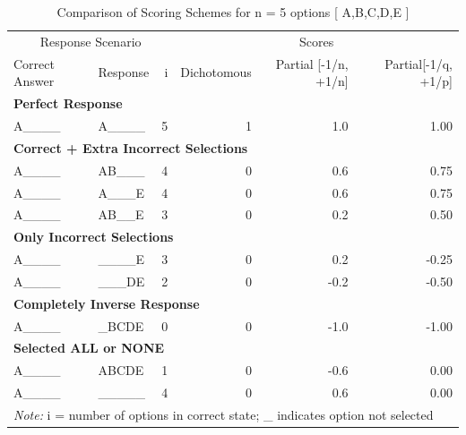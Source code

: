 \documentclass[
  letterpaper,
  DIV=11,
  numbers=noendperiod]{scrreprt}
\begin{document}
\begin{table}

\caption{Comparison of Scoring Schemes for n = 5 options [ A,B,C,D,E ]}
\centering
\begin{tabular}[t]{l|l|r|r|r|r}
\hline
\multicolumn{3}{c|}{Response Scenario } & \multicolumn{3}{c}{Scores} \\
\cline{1-3} \cline{4-6}
Correct Answer & Response & i  & Dichotomous & Partial [-1/n, +1/n] & Partial[-1/q, +1/p]\\
\hline
\multicolumn{6}{l}{\textbf{Perfect Response}}\\
\hline
\hspace{1em}A\_\_\_\_ & A\_\_\_\_ & 5 & 1 & 1.0 & 1.00\\
\hline
\multicolumn{6}{l}{\textbf{Correct + Extra Incorrect Selections}}\\
\hline
\hspace{1em}A\_\_\_\_ & AB\_\_\_ & 4 & 0 & 0.6 & 0.75\\
\hline
\hspace{1em}A\_\_\_\_ & A\_\_\_E & 4 & 0 & 0.6 & 0.75\\
\hline
\hspace{1em}A\_\_\_\_ & AB\_\_E & 3 & 0 & 0.2 & 0.50\\
\hline
\multicolumn{6}{l}{\textbf{Only Incorrect Selections}}\\
\hline
\hspace{1em}A\_\_\_\_ & \_\_\_\_E & 3 & 0 & 0.2 & -0.25\\
\hline
\hspace{1em}A\_\_\_\_ & \_\_\_DE & 2 & 0 & -0.2 & -0.50\\
\hline
\multicolumn{6}{l}{\textbf{Completely Inverse Response }}\\
\hline
\hspace{1em}A\_\_\_\_ & \_BCDE & 0 & 0 & -1.0 & -1.00\\
\hline
\multicolumn{6}{l}{\textbf{Selected ALL or NONE}}\\
\hline
\hspace{1em}A\_\_\_\_ & ABCDE & 1 & 0 & -0.6 & 0.00\\
\hline
\hspace{1em}A\_\_\_\_ & \_\_\_\_\_ & 4 & 0 & 0.6 & 0.00\\
\hline
\multicolumn{6}{l}{\rule{0pt}{1em}\textit{Note: } i = number of options in correct state; \_ indicates option not selected}\\
\end{tabular}
\end{table}
\end{document}
